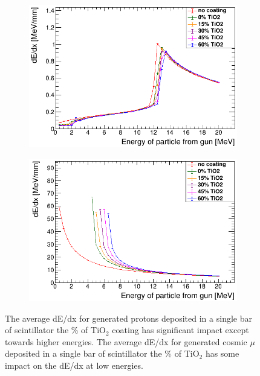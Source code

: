 \begin{figure}[!h]
\centering
\begin{subfigure}{.5\textwidth}
  \centering
  \includegraphics[width=\linewidth]{Chapter4/Figs/muon_TiO2_hybrid.png}
  \captionsetup{width=.9\linewidth}
  \caption{}
  \label{subFig:proton_TiO2}
\end{subfigure}%
\begin{subfigure}{.5\textwidth}
  \centering
  \includegraphics[width=\linewidth]{Chapter4/Figs/proton_TiO2_hybrid.png}
  \captionsetup{width=.9\linewidth}
  \caption{}
  \label{subFig:muon_TiO2}
\end{subfigure}
\caption{The average dE/dx for generated protons deposited in a single bar of scintillator the \%  of TiO$_2$ coating has significant impact except towards higher energies. The average dE/dx for generated cosmic $\mu$ deposited in a single bar of scintillator the \% of TiO$_2$ has some impact on the dE/dx at low energies.}
\label{fig:muonProton_TiO2}
\end{figure}

